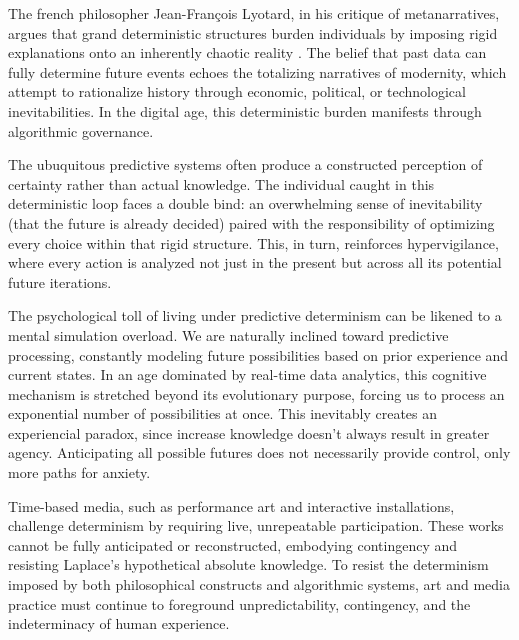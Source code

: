The french philosopher Jean-François Lyotard, in his critique of metanarratives, argues that grand deterministic structures burden individuals by imposing rigid explanations onto an inherently chaotic reality \citep{lyotard1979}. The belief that past data can fully determine future events echoes the totalizing narratives of modernity, which attempt to rationalize history through economic, political, or technological inevitabilities. In the digital age, this deterministic burden manifests through algorithmic governance. 

The ubuquitous predictive systems often produce a constructed perception of certainty rather than actual knowledge. The individual caught in this deterministic loop faces a double bind: an overwhelming sense of inevitability (that the future is already decided) paired with the responsibility of optimizing every choice within that rigid structure. This, in turn, reinforces hypervigilance, where every action is analyzed not just in the present but across all its potential future iterations.

% 
The psychological toll of living under predictive determinism can be likened to a mental simulation overload.
We are naturally inclined toward predictive processing, constantly modeling future possibilities based on prior experience and current states. In an age dominated by real-time data analytics, this cognitive mechanism is stretched beyond its evolutionary purpose, forcing us to process an exponential number of possibilities at once. This inevitably creates an experiencial paradox, since increase knowledge doesn't always result in greater agency. Anticipating all possible futures does not necessarily provide control, only more paths for anxiety.
% 

%
Time-based media, such as performance art and interactive installations, challenge determinism by requiring live, unrepeatable participation. These works cannot be fully anticipated or reconstructed, embodying contingency and resisting Laplace's hypothetical absolute knowledge. To resist the determinism imposed by both philosophical constructs and algorithmic systems, art and media practice must continue to foreground unpredictability, contingency, and the indeterminacy of human experience.

